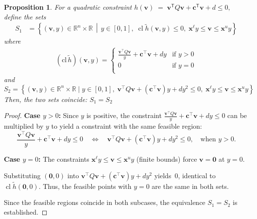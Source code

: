 \documentclass[11pt]{article}
\newtheorem{proposition}{Proposition}
\begin{document}
\begin{proposition}
\label{prop:sets}
For a quadratic constraint \(
    h(\mathbf v)\;=\;\mathbf v^{\mathsf T}Q\mathbf v
                 + \mathbf{c}^{\mathsf T}\mathbf v + d \leq 0,
\) define the sets
\begin{equation*}
\begin{aligned}
S_1 & = \left\{ (\mathbf{v}, y) \in \mathbb{R}^n \times \mathbb{R} \,\middle|\, y \in [0, 1], \; \operatorname{cl} \widetilde{h}(\mathbf{v}, y) \leq 0, \; \mathbf x^{\ell} y \leq \mathbf{v} \leq \mathbf{x}^u y \right\}
\end{aligned}
\end{equation*}
where
\begingroup
\begin{equation*}
\begin{aligned}
    \left( \text{cl} \, \widetilde{h} \right)(\mathbf{v}, y) = 
\begin{cases} 
    \frac{\mathbf{v}^\top Q  \mathbf{v}}{y} + \mathbf{c}^\top \mathbf{v} + d y  & \text{if } y > 0 \\[5pt]
    0 & \text{if } y = 0 \\[1pt]
\end{cases}
\end{aligned}
\end{equation*}
\endgroup
and
\[
S_{2} =  \left\{ (\mathbf{v}, y) \in \mathbb{R}^n \times \mathbb{R} \mid y \in [0, 1], \; \mathbf{v}^\top Q \mathbf{v} + (\mathbf{c}^\top \mathbf{v}) y + d y^2 \leq 0,  \; \mathbf x^{\ell} y \leq \mathbf{v} \leq \mathbf{x}^u y \right\}
\]
Then, the two sets coincide: \( S_1 = S_2\) 
\end{proposition}




\begin{proof}


\textbf{Case \(y>0\):}  
Since \(y\) is positive, the constraint \(\frac{\mathbf{v}^\top Q \mathbf{v}}{y} + \mathbf{c}^\top \mathbf{v} + d y \leq 0\) can be multiplied by \(y\) to yield a constraint with the same feasible region:
\begin{equation*}
\frac{\mathbf{v}^\top Q \mathbf{v}}{y} + \mathbf{c}^\top \mathbf{v} + d y \leq 0 \quad \Longleftrightarrow \quad \mathbf{v}^\top Q \mathbf{v} + (\mathbf{c}^\top \mathbf{v}) y + d y^2 \leq 0, \quad \text{when } y>0.
\end{equation*}

\noindent
\textbf{Case \(y=0\):}   
 The constraints \(\mathbf x^{\ell}y\le\mathbf v\le\mathbf x^{u}y\) (finite bounds) force
\(\mathbf v=\mathbf 0\) at \(y=0\).


Substituting \((\mathbf 0,0)\) into \(\mathbf{v}^\top Q \mathbf{v} + (\mathbf{c}^\top \mathbf{v}) y + d y^2  \) yields~0, identical to
\(\operatorname{cl}\widetilde h(\mathbf 0,0)\).
Thus, the feasible points with
\(y=0\) are the same in both sets.


Since the feasible regions coincide in both subcases, the equivalence \( S_1 = S_2\) is established.
\end{proof}
\end{document}
